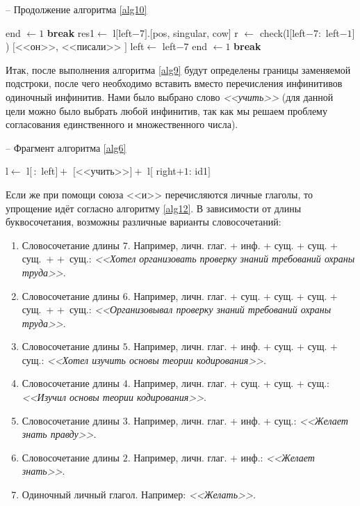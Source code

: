 \documentclass[main]{subfiles}
\begin{document}
\begin{algorithm}[!h]
	\caption{-- Продолжение алгоритма \ref{alg10}}\label{alg33}
	\begin{algorithmic}[1]
		\State end $\gets 1$
		\State \textbf{break}
		\EndIf
		\EndIf
		\EndFor
		\EndIf
		\State res1$\gets$ l$[$left$-7]$.[pos, singular, cow]
		\State r $\gets$ check(l$[$left$-7:$ left$-1]$)
		\State \Return $[$<<он>>, <<писали>> $]$
		\State left$\gets$ left$-7$
		\State end $\gets 1$
		\State \textbf{break}
		\EndIf
		\EndIf
		\EndFor
		\EndIf
	\end{algorithmic}
\end{algorithm}

Итак, после выполнения алгоритма \ref{alg9} будут определены границы заменяемой подстроки, после чего необходимо вставить вместо перечисления инфинитивов одиночный инфинитив. Нами было выбрано слово \textit{<<учить>>} (для данной цели можно было выбрать любой инфинитив, так как мы решаем проблему согласования единственного и множественного числа).

\begin{algorithm}[!h]
	\caption{-- Фрагмент алгоритма \ref{alg6}}\label{alg11}
	\begin{algorithmic}[1]
		\State l$\gets$ l$[\,:$ left$] +$ $[$<<учить>>$]+$ l$[$ right$+1:\, $id1$]$
	\end{algorithmic}
\end{algorithm}

Если же при помощи союза <<и>> перечисляются личные глаголы, то упрощение идёт согласно алгоритму \ref{alg12}. В зависимости от длины буквосочетания, возможны различные варианты словосочетаний:
\begin{enumerate}
	\item Словосочетание длины $7$. Например, личн. глаг. + инф. + сущ. + сущ. + сущ.~+ +~сущ.: \textit{<<Хотел организовать проверку знаний требований охраны труда>>}.
	\item Словосочетание длины $6$. Например, личн. глаг. + сущ. + сущ. + сущ. + сущ.~+ +~сущ.: \textit{<<Организовывал проверку знаний требований охраны труда>>}.
	\item Словосочетание длины $5$. Например, личн. глаг. + инф. + сущ. + сущ. + сущ.: \textit{<<Хотел изучить основы теории кодирования>>}.
	\item Словосочетание длины $4$. Например, личн. глаг. + сущ. + сущ. + сущ.: \textit{<<Изучил основы теории кодирования>>}.
	\item Словосочетание длины $3$. Например, личн. глаг. + инф. + сущ.: \textit{<<Желает знать правду>>}.
	\item Словосочетание длины $2$. Например, личн. глаг. + инф.: \textit{<<Желает знать>>}.
	\item Одиночный личный глагол. Например: \textit{<<Желать>>}.
\end{enumerate}
\end{document}
